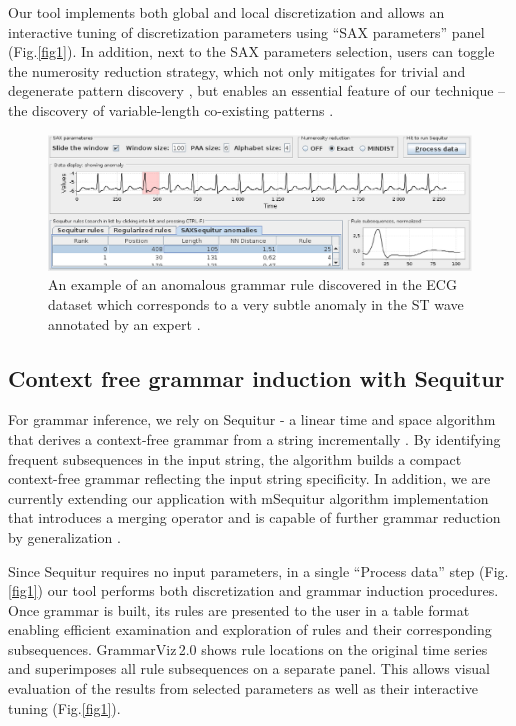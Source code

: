 \documentclass{llncs}
\begin{document}
Our tool implements both global and local discretization and allows an interactive tuning of discretization parameters using ``SAX parameters'' panel (Fig.\ref{fig1}). In addition, next to the SAX parameters selection, users can toggle the numerosity reduction strategy, which not only mitigates for trivial and degenerate pattern discovery \cite{sax, hot_sax}, but enables an essential feature of our technique -- the discovery of variable-length co-existing patterns \cite{grammarviz, SAXSequitur14}. 

\begin{figure}[t]
   \centering
   \includegraphics[width=120mm]{Figure2-ECG0606-anomaly.eps}
    \caption{An example of an anomalous grammar rule discovered in the ECG dataset which corresponds to a very subtle anomaly in the ST wave annotated by an expert \cite{hot_sax}.}
   \label{fig2}
\end{figure}

\subsection{Context free grammar induction with Sequitur}
For grammar inference, we rely on Sequitur - a linear time and space algorithm that derives a context-free grammar from a string incrementally \cite{sequitur}. By identifying frequent subsequences in the input string, the algorithm builds a compact context-free grammar reflecting the input string specificity. In addition, we are currently extending our application with mSequitur algorithm implementation that introduces a merging operator and is capable of further grammar reduction by generalization \cite{msequitur}.

Since Sequitur requires no input parameters, in a single ``Process data'' step (Fig.\ref{fig1}) our tool performs both discretization and grammar induction procedures. Once grammar is built, its rules are presented to the user in a table format enabling efficient examination and exploration of rules and their corresponding subsequences. \mbox{GrammarViz\,2.0} shows rule locations on the original time series and superimposes all rule subsequences on a separate panel. This allows visual evaluation of the results from selected parameters as well as their interactive tuning (Fig.\ref{fig1}).
\end{document}
